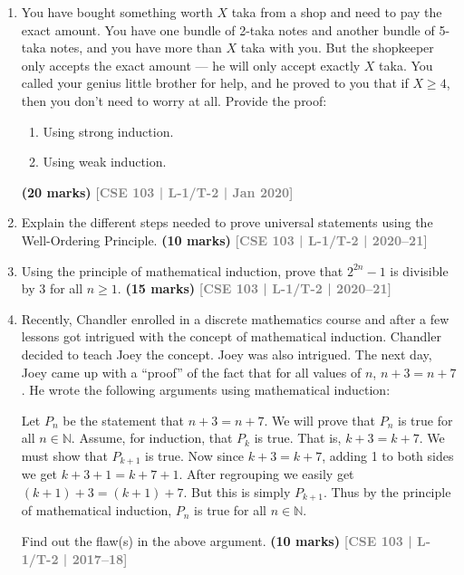 \documentclass[12pt,a3paper]{article}
\newcommand{\yr}[1]{\hfill\textcolor{gray}{\small\textbf{[#1]}}}
\newcommand{\mk}[1]{\textcolor{orange!70!black}{\small\textbf{(#1 marks)}}}
\begin{document}
\begin{enumerate}
\vspace{4pt}
Chandler is baffled by the proof. Help Chandler find the flaw(s) in the above argument and explain the issue elaborately.
\mk{10} \yr{CSE 103 | L-1/T-2 | Jan 2021, 2020}

\item You have bought something worth $X$ taka from a shop and need to pay the exact amount. You have one bundle of 2-taka notes and another bundle of 5-taka notes, and you have more than $X$ taka with you. But the shopkeeper only accepts the exact amount — he will only accept exactly $X$ taka. You called your genius little brother for help, and he proved to you that if $X \geq 4$, then you don't need to worry at all. Provide the proof:
\begin{enumerate}
  \item Using strong induction.
  \item Using weak induction.
\end{enumerate}
\mk{20} \yr{CSE 103 | L-1/T-2 | Jan 2020}


\item Explain the different steps needed to prove universal statements using the Well-Ordering Principle.
\mk{10} \yr{CSE 103 | L-1/T-2 | 2020--21}

\item Using the principle of mathematical induction, prove that $2^{2n} - 1$ is divisible by 3 for all $n \geq 1$.
\mk{15} \yr{CSE 103 | L-1/T-2 | 2020--21}  

\item Recently, Chandler enrolled in a discrete mathematics course and after a few lessons got intrigued with the concept of mathematical induction. Chandler decided to teach Joey the concept. Joey was also intrigued. The next day, Joey came up with a ``proof'' of the fact that for all values of $n$, $n + 3 = n + 7$. He wrote the following arguments using mathematical induction:
\begin{tcolorbox}[breakable,colback=gray!5,colframe=gray!40,boxrule=0.5pt,arc=4pt,
  left=8pt,right=8pt,top=6pt,bottom=6pt]
  \small
Let $P_n$ be the statement that $n + 3 = n + 7$. We will prove that $P_n$ is true for all $n \in \mathbb{N}$. Assume, for induction, that $P_k$ is true. That is, $k + 3 = k + 7$. We must show that $P_{k+1}$ is true. Now since $k + 3 = k + 7$, adding 1 to both sides we get $k + 3 + 1 = k + 7 + 1$. After regrouping we easily get $(k+1) + 3 = (k+1) + 7$. But this is simply $P_{k+1}$. Thus by the principle of mathematical induction, $P_n$ is true for all $n \in \mathbb{N}$.
\end{tcolorbox}
Find out the flaw(s) in the above argument.
\mk{10} \yr{CSE 103 | L-1/T-2 | 2017--18}


\end{enumerate}
\end{document}
